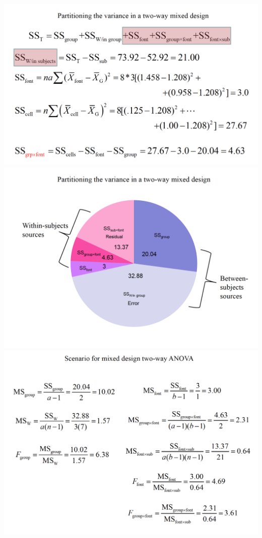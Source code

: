 \documentclass[]{book}
\theoremstyle{definition}
\theoremstyle{definition}
\theoremstyle{definition}
\theoremstyle{remark}
\begin{document}
\includegraphics{img/hicksfdrm9.png}
\includegraphics{img/hicksfdrm10.png}
\includegraphics{img/hicksfdrm11.png}
\end{document}
